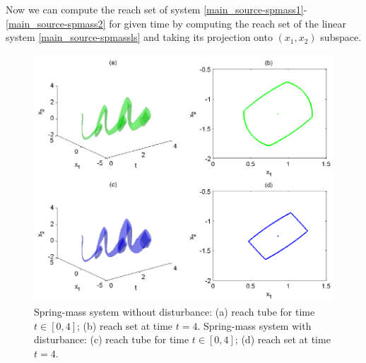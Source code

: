 \documentclass[letterpaper,10pt,english]{sphinxmanual}
\begin{document}
Now we can compute the reach set of system \eqref{main_source-spmass1}-\eqref{main_source-spmass2} for
given time by computing the reach set of the linear system \eqref{main_source-spmassls}
and taking its projection onto $(x_1, x_2)$ subspace.
\begin{figure}[htbp]
\centering
\capstart

\includegraphics{reachmech.png}
\caption{Spring-mass system without disturbance:
(a) reach tube for time $t\in[0,4]$; (b) reach set at time $t=4$.
Spring-mass system with disturbance:
(c) reach tube for time $t\in[0,4]$; (d) reach set at time $t=4$.}\label{main_source:mechreachfig}\end{figure}
\end{document}

